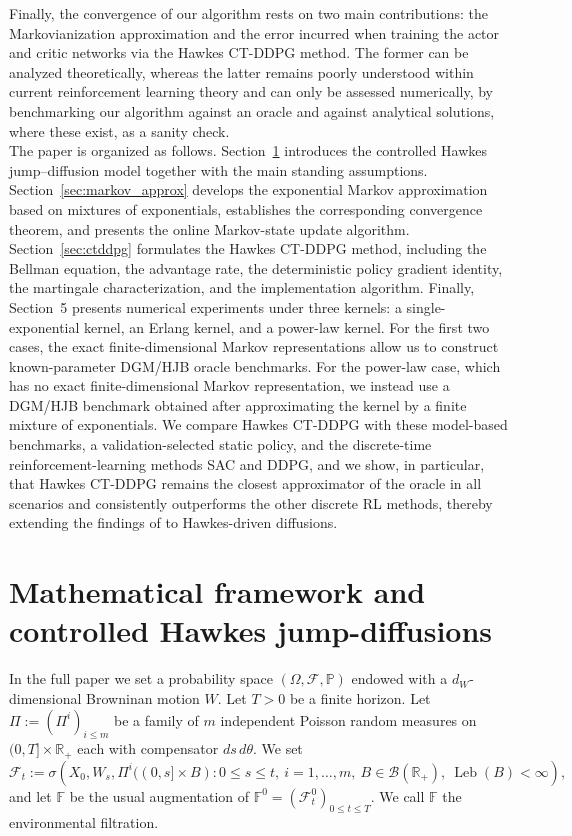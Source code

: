 \documentclass[11pt]{article}
\theoremstyle{remarkitalic}
\theoremstyle{remarkitalic}
\newcommand{\1}{\mathbf 1}
\begin{document}
Finally, the convergence of our algorithm rests on two main contributions: the Markovianization approximation and the error incurred when training the actor and critic networks via the Hawkes CT-DDPG method. The former can be analyzed theoretically, whereas the latter remains poorly understood within current reinforcement learning theory and can only be assessed numerically, by benchmarking our algorithm against an oracle and against analytical solutions, where these exist, as a sanity check.\\

The paper is organized as follows. Section~\ref{sec:model} introduces the controlled Hawkes jump--diffusion model together with the main standing assumptions. Section~\ref{sec:markov_approx} develops the exponential Markov approximation based on mixtures of exponentials, establishes the corresponding convergence theorem, and presents the online Markov-state update algorithm. Section~\ref{sec:ctddpg} formulates the Hawkes CT-DDPG method, including the Bellman equation, the advantage rate, the deterministic policy gradient identity, the martingale characterization, and the implementation algorithm. Finally, Section~5 presents numerical experiments under three kernels:
a single-exponential kernel, an Erlang kernel, and a power-law kernel.
For the first two cases, the exact finite-dimensional Markov
representations allow us to construct known-parameter DGM/HJB oracle
benchmarks. For the power-law case, which has no exact
finite-dimensional Markov representation, we instead use a
DGM/HJB benchmark obtained after approximating the kernel by a finite
mixture of exponentials. We compare Hawkes CT-DDPG with these
model-based benchmarks, a validation-selected static policy, and the
discrete-time reinforcement-learning methods SAC and DDPG, and
we show, in particular, that Hawkes CT-DDPG remains the closest approximator of the oracle in all scenarios and consistently outperforms the other discrete RL methods, thereby extending the findings of \cite{ChengGuoZhang2026} to Hawkes-driven diffusions. 

\section{Mathematical framework and controlled Hawkes jump-diffusions}
\label{sec:model}


In the full paper we set a probability space $(\Omega,\mathcal F,\mathbb P)$ endowed with a $d_W$-dimensional Browninan motion $W$. 
Let $T>0$ be a finite horizon. 
Let $\Pi:=(\Pi^i)_{i\leq m}$ be a family of $m$ independent Poisson random measures on $(0,T]\times\mathbb{R}_+$ each with compensator $ds\,d\theta$. We set
\[
\mathcal{F}_t
:=
\sigma\!\left(
X_0,
W_s,
\Pi^i((0,s]\times B):
0\leq s\leq t,\ i=1,\ldots,m,\
B\in\mathcal{B}(\mathbb{R}_+),\ \operatorname{Leb}(B)<\infty
\right),
\]
and let $\mathbb{F}$ be the usual augmentation of
$\mathbb{F}^0=(\mathcal{F}^{0}_t)_{0\leq t\leq T}$.
We call $\mathbb{F}$ the environmental filtration.
\end{document}
